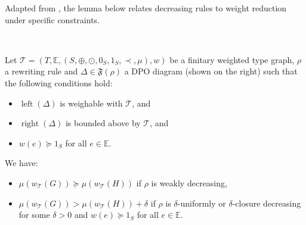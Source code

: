 Adapted from \cite[Theorem C.3]{endrullis2024generalized_arxiv_v2}, the lemma below relates decreasing rules to weight reduction under specific constraints. 
\begin{lemma}
    \label{lem:decreasing_step}
\ \newline
\begin{minipage}{0.7\textwidth}
    Let $\mathcal{T} = (T,\mathbb{E}, (S, \oplus, \odot, 0_S, 1_S, \prec, \mu), w)$ be a finitary weighted type graph, $\rho$ a rewriting rule and $\Delta \in \mathfrak{F}(\rho)$ a DPO diagram
    (shown on the right)   such that the following conditions hold:
\end{minipage}  
\begin{minipage}{0.3\textwidth}
    \begin{center}
      \end{center}
\end{minipage}
   \begin{itemize}
       \item $\operatorname{left}(\Delta)$ is weighable with \(\mathcal{T}\), and
       \item $\operatorname{right}(\Delta)$ is bounded above by \(\mathcal{T}\), and
       \item $w(e) \succeq 1_S$ for all $e \in \mathbb{E}$.
   \end{itemize}

   \noindent
  We have:
   \begin{itemize}
       \item $\mu(w_\mathcal{T}(G)) \succeq \mu(w_\mathcal{T}(H))$ if $\rho$ is weakly decreasing,
       \item $\mu(w_\mathcal{T}(G)) > \mu(w_\mathcal{T}(H)) + \delta$ if $\rho$ is $\delta$-uniformly or $\delta$-closure decreasing for some $\delta >0$ and $w(e) \succeq 1_S$ for all $e \in \mathbb{E}$.
   \end{itemize}
\end{lemma} 

